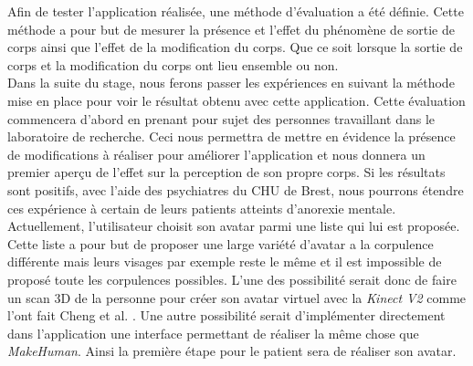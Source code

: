 \documentclass[11pt]{article}
\begin{document}
Afin de tester l'application réalisée, une méthode d'évaluation a été définie. Cette méthode a pour but de mesurer la présence et l'effet du phénomène de sortie de corps ainsi que l'effet de la modification du corps. Que ce soit lorsque la sortie de corps et la modification du corps ont lieu ensemble ou non.\\

Dans la suite du stage, nous ferons passer les expériences en suivant la méthode mise en place pour voir le résultat obtenu avec cette application. Cette évaluation commencera d'abord en prenant pour sujet des personnes travaillant dans le laboratoire de recherche. Ceci nous permettra de mettre en évidence la présence de modifications à réaliser pour améliorer l'application et nous donnera un premier aperçu de l'effet sur la perception de son propre corps. Si les résultats sont positifs, avec l'aide des psychiatres du CHU de Brest, nous pourrons étendre ces expérience à certain de leurs patients atteints d'anorexie mentale.\\

Actuellement, l'utilisateur choisit son avatar parmi une liste qui lui est proposée. Cette liste a pour but de proposer une large variété d'avatar a la corpulence différente mais leurs visages par exemple reste le même et il est impossible de proposé toute les corpulences possibles. L'une des possibilité serait donc de faire un scan 3D de la personne pour créer son avatar virtuel avec la \emph{Kinect V2} comme l'ont fait Cheng et al. \cite{ch15}. Une autre possibilité serait d'implémenter directement dans l'application une interface permettant de réaliser la même chose que \emph{MakeHuman}. Ainsi la première étape pour le patient sera de réaliser son avatar.

\newpage 

%
%

\end{document}
